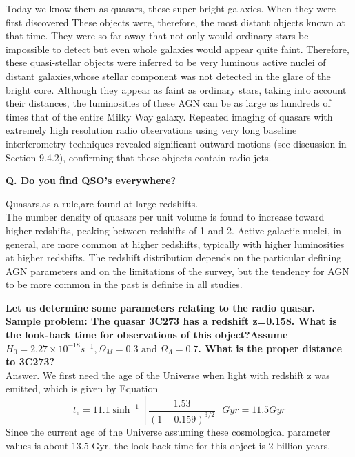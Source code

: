 \documentclass[10pt]{report}
\newcommand{\tbf}[1]{\textbf{#1}}
\newcommand{\cc}[1]{\left({#1}\right)}
\newcommand{\rr}[1]{\left[{#1}\right]}
\begin{document}
Today we know them as quasars, these super bright galaxies. When they were first discovered  These objects were, therefore, the most distant objects known at that time. They were so far away that not only would ordinary stars be impossible to detect but even whole galaxies would appear quite faint. Therefore, these quasi-stellar objects were inferred to be very luminous active nuclei of distant galaxies,whose stellar component was not detected in the glare of the bright core. Although they appear as faint as ordinary stars, taking into account their distances, the luminosities of these AGN can be as large as hundreds of times that of the entire Milky Way galaxy.  Repeated imaging of quasars with extremely high resolution radio observations using very long baseline interferometry techniques revealed significant outward motions (see discussion in Section 9.4.2), confirming that these objects contain radio jets.



\tbf{Q. Do you find QSO's everywhere?}

Quasars,as a rule,are found at large redshifts.\\

The number density of quasars per unit volume is found to increase toward higher redshifts, peaking between redshifts of 1 and 2. Active galactic nuclei, in general, are more common at higher redshifts, typically with higher luminosities at higher redshifts. The redshift distribution depends on the particular defining AGN parameters and on the limitations of the survey, but the tendency for AGN to be more common in the past is definite in all studies. 

\tbf{Let us determine some parameters relating to the radio quasar.}\\
\tbf{Sample problem: The quasar 3C273 has a redshift z=0.158. What is the look-back time for observations of this object?Assume $H_0 =2.27\times 10^{-18} s^{-1}, \Omega_M =0.3 \text{ and } \Omega_\Lambda =0.7$. What is the proper distance to 3C273? }\\

Answer.  We first need the age of the Universe when light with redshift z was emitted, which is given by Equation
\begin{equation}
t_e=11.1 \sinh^{-1}\rr{\frac{1.53}{\cc{1+0.159}^{3/2}}}Gyr=11.5Gyr
\end{equation}
Since the current age of the Universe assuming these cosmological parameter values is about 13.5 Gyr, the look-back time for this object is 2 billion years. \\
\end{document}
